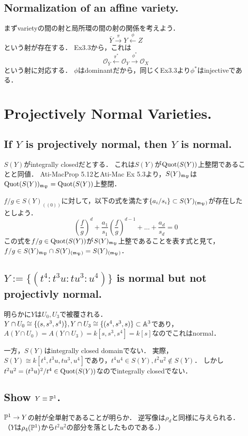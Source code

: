 \documentclass[a4paper]{jarticle}
\begin{document}
    \subsection{Normalization of an affine variety.}
    まずvarietyの間の射と局所環の間の射の関係を考えよう．
    \[ \bar{Y} \xrightarrow{\pi} Y \xleftarrow{\phi} Z \]という射が存在する．
    Ex3.3から，これは
    \[ \mathcal{O}_{\bar{Y}} \xleftarrow{\pi^{\ast}} \mathcal{O}_{Y} \xrightarrow{\phi^{\ast}} \mathcal{O}_{X} \]
    という射に対応する．
    $\phi$はdominantだから，同じくEx3.3より$\phi^{\ast}$はinjectiveである．

\section{Projectively Normal Varieties.} 
    \subsection{If $Y$ is projectively normal, then $Y$ is normal.}
    $S(Y)$がintegrally closedだとする．
    これは$S(Y)$が$\operatorname{Quot}(S(Y))$上整閉であることと同値．
    Ati-MacProp 5.12とAti-Mac Ex 5.3より，$S(Y)_{\mathfrak{m_P}}$は$\operatorname{Quot}(S(Y))_{\mathfrak{m_P}}=\operatorname{Quot}(S(Y))$上整閉．
    
    $f/g \in S(Y)_{((0))}$に対して，以下の式を満たす$\{a_i/s_i\} \subset S(Y)_{(\mathfrak{m_P})}$が存在したとしよう．
    \[ \left( \frac{f}{g} \right)^{d}+\frac{a_1}{s_1} \left( \frac{f}{g} \right)^{d-1}+\dots+\frac{a_d}{s_d}=0 \]
    この式を$f/g \in \operatorname{Quot}(S(Y))$が$S(Y)_{\mathfrak{m_P}}$上整であることを表す式と見て，
    $f/g \in S(Y)_{\mathfrak{m_P}} \cap S(Y)_{(\mathfrak{m_P})}=S(Y)_{(\mathfrak{m_P})}$．

   \subsection{$Y:=\{(t^4:t^3 u:tu^3:u^4)\}$ is normal but not projectivly normal.}
    明らかに$Y$は$U_0, U_3$で被覆される．
    $Y \cap U_0 \cong \{(s,s^3,s^4)\}, Y \cap U_3 \cong \{(s^4,s^3,s)\} \subset \mathbb{A}^3$であり，
    $A(Y \cap U_0)=A(Y \cap U_3)=k[s,s^3,s^4]=k[s]$なのでこれはnormal．

    一方，$S(Y)$はintegrally closed domainでない．
    実際，$S(Y) \cong k[t^4,t^3 u,tu^3,u^4]$であり，$t^4 u^4 \in S(Y), t^2 u^2 \not \in S(Y)$．
    しかし$t^2 u^2=(t^3 u)^2/t^4 \in \operatorname{Quot}(S(Y))$なのでintegrally closedでない．

   \subsection{Show $Y \equiv \mathbb{P}^1$. }
   $\mathbb{P}^1 \to Y$の射が全単射であることが明らか．
   逆写像は$\rho_d$と同様に与えられる．
   （$Y$は$\rho_4(\mathbb{P}^1)$から$t^2u^2$の部分を落としたものである．）
\end{document}
